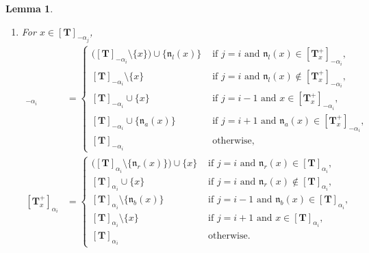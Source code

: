 \documentclass[12pt]{amsart}
\newtheorem{lem}[thm]{Lemma}
\numberwithin{equation}{thm}
\newcommand\bT{\mathbf T}
\newcommand\fn{\mathfrak n}
\renewcommand\a{\alpha}  %
\begin{document}
\begin{lem}
\begin{enumerate}
\item 
For $x \in [\bT]_{-\a_j}$,  
\begin{align*}
[\bT_x^+]_{-\a_i} 
	&= \begin{cases}
		\big( [\bT]_{-\a_i} \setminus \{x\} \big) \cup \{ \fn_l (x) \} 
			& \text{ if } j=i \text{ and } \fn_l(x) \in [\bT_x^+]_{-\a_i}, 
		\\
		[\bT]_{-\a_i} \setminus \{x \} 
			& \text{ if } j=i \text{ and } \fn_l(x) \not\in [\bT_x^+]_{-\a_i}, 
		\\
		[\bT]_{-\a_i} \cup \{x\} 
			& \text{ if } j=i-1 \text{ and } x \in [\bT_x^+]_{-\a_i}, 
		\\
		[\bT]_{-\a_i} \cup \{ \fn_a (x)\} 
			& \text{ if } j=i+1 \text{ and } \fn_a(x) \in [\bT_x^+]_{-\a_i}, 
		\\
		[\bT]_{-\a_i} 
			& \text{ otherwise}, 
	\end{cases}
\\
[\bT_x^+]_{\a_i} 
	&= \begin{cases}
	\big( [\bT]_{\a_i} \setminus \{\fn_r(x) \} \big) \cup \{x\} 
		& \text{ if } j=i \text{ and } \fn_r (x) \in [\bT]_{\a_i}, 
	\\
	[\bT]_{\a_i} \cup \{ x\} 
		& \text{ if } j=i \text{ and } \fn_r (x) \not\in [\bT]_{\a_i}, 
	\\
	[\bT]_{\a_i} \setminus \{\fn_b (x) \} 
		& \text{ if } j=i-1 \text{ and } \fn_b(x) \in [\bT]_{\a_i}, 
	\\
	[\bT]_{\a_i} \setminus \{x\} 
		& \text{ if } j=i+1 \text{ and } x \in [\bT]_{\a_i}, 
	\\
	[\bT]_{\a_i} 
		& \text{ otherwise}.
	\end{cases}
\end{align*}
\end{enumerate}
\end{lem} 

\end{document}
